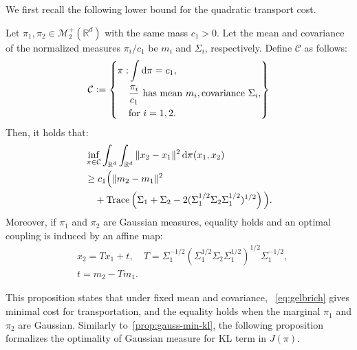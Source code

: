 \documentclass{ifacconf}
\newcommand{\R}{{\mathbb R}}
\newcommand{\rmd}{{\rm d}}
\newcommand{\tr}{\mathop{\rm Trace}\nolimits}
\newcommand{\Rd}{\R ^{d}}
\newcommand{\calC}{{\mathcal C}}
\newcommand{\calM}{{\mathcal M}}
\begin{document}
We first recall the following lower bound for the quadratic transport cost.

\begin{prop}\label{prop:transport-lb}
Let $\pi_1,\pi_2\in\calM_2^{+}(\Rd)$  with the same mass $c_1>0$.
Let the mean and covariance of the normalized measures $\pi_i/c_1$ be $m_i$ and $\Sigma_i$, respectively.
Define \(\calC\) as follows:
\begin{equation*}
    \calC:=\left\{
        \begin{aligned}
            \pi:&\int \rmd\pi =c_1, \\
            &\frac{\pi_{i}}{c_{1}}\mbox{ has mean }m_i, \mbox{covariance }\Sigma_{i}, \\
            &\mbox{for } i=1,2.
        \end{aligned} \right\}
\end{equation*}
Then, it holds that:
\begin{equation}\label{eq:gelbrich}
    \begin{aligned}
        &\inf_{\pi\in\calC} \int_{\Rd}\int_{\Rd} \|x_2-x_1\|^2 \,\rmd \pi(x_1,x_2) \\ 
        &\ge c_1\Big(\|m_2-m_1\|^2 \\
        &\quad+\tr\left(\Sigma_1+\Sigma_2-2(\Sigma_1^{1/2}\Sigma_2\Sigma_1^{1/2})^{1/2}\right)\Big).
    \end{aligned}
\end{equation}
Moreover, if $\pi_1$ and $\pi_2$ are Gaussian measures, equality holds and an optimal coupling is induced by an affine map:
\begin{align*}\label{eq:uot-affine-map}
    &x_2 = T x_1 + t, \quad T = \Sigma_1^{-1/2}(\Sigma_1^{1/2}\Sigma_2\Sigma_1^{1/2})^{1/2}\Sigma_1^{-1/2},\\
    &t = m_2 - Tm_1.
\end{align*}
\end{prop}
This proposition states that under fixed mean and covariance, ~\eqref{eq:gelbrich} gives minimal cost for transportation, and the equality holds when the marginal \(\pi_1\) and \(\pi_2\) are Gaussian.
Similarly to~\eqref{prop:gauss-min-kl}, the following proposition formalizes the optimality of Gaussian measure for KL term in \(J(\pi)\).
\end{document}
